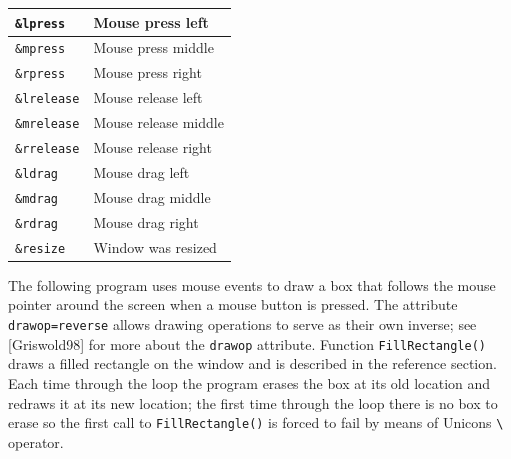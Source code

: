 \begin{center}
\begin{supertabular}{|m{0.9247598in}|m{2.3525598in}|}
\texttt{\&lpress} &
Mouse press left\\\hline
\texttt{\&mpress} &
Mouse press middle\\\hline
\texttt{\&rpress} &
Mouse press right\\\hline
\texttt{\&lrelease} &
Mouse release left\\\hline
\texttt{\&mrelease} &
Mouse release middle\\\hline
\texttt{\&rrelease} &
Mouse release right \\\hline
\texttt{\&ldrag} &
Mouse drag left \\\hline
\texttt{\&mdrag} &
Mouse drag middle \\\hline
\texttt{\&rdrag} &
Mouse drag right \\\hline
\texttt{\&resize} &
Window was resized \\\hline
\end{supertabular}
\end{center}
The following program uses mouse events to draw a box that follows the
mouse pointer around the screen when a mouse button is pressed. The
attribute \texttt{drawop=reverse} allows drawing operations to serve as
their own inverse; see [Griswold98] for more about the \texttt{drawop}
attribute. Function \texttt{FillRectangle()} draws a filled rectangle
on the window and is described in the reference section. Each time
through the loop the program erases the box at its old location and
redraws it at its new location; the first time through the loop there
is no box to erase so the first call to \texttt{FillRectangle()} is
forced to fail by means of Unicon{\textquotesingle}s
\texttt{{\textbackslash}} operator.


